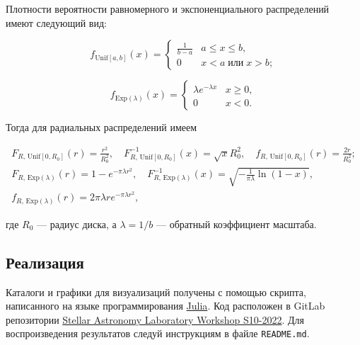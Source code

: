 \documentclass[a4paper, oneside]{article}
\newcommand{\su}{\vspace{-0.5em}}
\newcommand{\npar}{\par\vspace{\baselineskip}}
\begin{document}
Плотности вероятности равномерного и экспоненциального распределений \\ имеют следующий вид:

\su
\begin{equation}
  f_{\mathrm{Unif}[a, b]}(x) = \begin{cases}
    \frac{1}{b - a} & a \leq x \leq b, \\
    0 & x < a \; \textit{или} \; x > b;
  \end{cases}
\end{equation}

\su
\begin{equation}
  f_{\mathrm{Exp}(\lambda)}(x) = \begin{cases}
    \lambda e^{-\lambda x} & x \geq 0, \\
    0 & x < 0.
  \end{cases}
\end{equation}

Тогда для радиальных распределений имеем

\su
\begin{equation}
\begin{gathered}
  F_{R, \, \mathrm{Unif}[0, R_0]}(r) = \frac{r^2}{R_0^2}, \quad F_{R, \, \mathrm{Unif}[0, R_0]}^{-1}(x) = \sqrt{x} R_0^2, \quad f_{R, \, \mathrm{Unif}[0, R_0]}(r) = \frac{2 r}{R_0^2}; \\
F_{R, \, \mathrm{Exp}(\lambda)}(r) = 1 - e^{-\pi \lambda r^2}, \quad F_{R, \, \mathrm{Exp}(\lambda)}^{-1}(x) = \sqrt{-\frac{1}{\pi \lambda} \ln{(1 - x)}}, \\
f_{R, \, \mathrm{Exp}(\lambda)}(r) = 2 \pi \lambda r e^{-\pi \lambda r^2},
\end{gathered}
\end{equation}

где $ R_0 $ --- радиус диска, а $ \lambda = 1 / b $ --- обратный коэффициент масштаба. \npar

\subsection*{Реализация}

Каталоги и графики для визуализаций получены с помощью скрипта, написанного на языке программирования \href{https://julialang.org}{Julia}. Код расположен в GitLab репозитории \href{https://gitlab.com/paveloom-g/university/s10-2022/stellar-astronomy-laboratory-workshop}{Stellar Astronomy Laboratory Workshop S10-2022}. Для воспроизведения результатов следуй инструкциям в файле {\footnotesize \texttt{README.md}}. \npar
\end{document}
